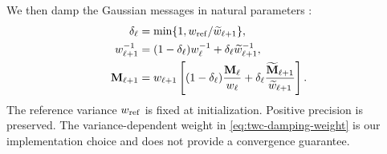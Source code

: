 We then damp the Gaussian messages in natural parameters \cite{vehtari2020}:
\begin{align}
 \delta_\ell&=\min\{1,w_{\rm ref}/\widetilde w_{\ell+1}\},
 \label{eq:twc-damping-weight}\\
 w_{\ell+1}^{-1}&=(1-\delta_\ell)w_\ell^{-1}
                   +\delta_\ell\widetilde w_{\ell+1}^{-1},
 \label{eq:twc-damping-precision}\\
 \mathbf M_{\ell+1}&=w_{\ell+1}
 \left[(1-\delta_\ell)\frac{\mathbf M_\ell}{w_\ell}
       +\delta_\ell\frac{\widetilde{\mathbf M}_{\ell+1}}
                          {\widetilde w_{\ell+1}}\right].
 \label{eq:twc-damping-mean}
\end{align}
The reference variance $w_{\rm ref}$ is fixed at initialization.
Positive precision is preserved. The variance-dependent weight in
\eqref{eq:twc-damping-weight} is our implementation choice and does not
provide a convergence guarantee.
